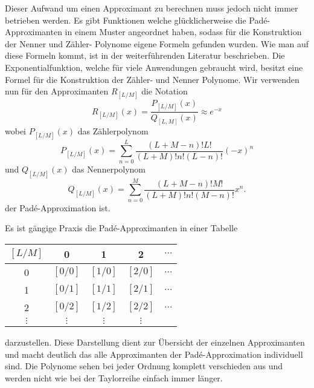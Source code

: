 Dieser Aufwand um einen Approximant zu berechnen muss jedoch nicht immer betrieben werden.
Es gibt Funktionen welche glücklicherweise die Padé-Approximanten in einem Muster angeordnet haben, sodass für die Konstruktion der Nenner und Zähler- Polynome eigene Formeln gefunden wurden.
Wie man auf diese Formeln kommt, ist in der weiterführenden Literatur \cite{pade:Baker2009} beschrieben.
Die Exponentialfunktion, welche für viele Anwendungen gebraucht wird, besitzt eine Formel \cite{pade:moler} für die Konstruktion der Zähler- und Nenner Polynome.
Wir verwenden nun für den Approximanten $R_{[L/M]}$ die Notation
\begin{equation}
R_{[L/M]}(x)
=
\frac{P_{[L/ M]}(x)}{Q_{[L, M]}(x)} \approx e^{-x}
\end{equation}
wobei $P_{[L/ M]}(x)$ das Zählerpolynom
\begin{equation}
P_{[L/ M]}(x)
=
\sum_{n=0}^{L} \frac{(L+M-n) ! L !}{(L+M) ! n !(L-n) !}(-x)^{n}
\label{pade:expP}
\end{equation}
und $Q_{[L/ M]}(x)$ das Nennerpolynom
\begin{equation}
Q_{[L/ M]}(x)
=
\sum_{n=0}^{M} \frac{(L+M-n) ! M !}{(L+M) ! n !(M-n) !} x^{n}.
\label{pade:expQ}
\end{equation}
 der Padé-Approximation ist.

Es ist gängige Praxis die Padé-Approximanten in einer Tabelle 
\begin{center}
	\begin{tabular}{c| c c c c}
		
		$[L/M]$ 	& 0 		& 1 		& 2 		& $\cdots$ \\
		\hline
		0 		& $[0/0]$ 	& $[1/0]$ 	& $[2/0]$ 	& $\dots$ \\
		1 		& $[0/1]$ 	& $[1/1]$ 	& $[2/1]$ 	& $\dots$ \\
		2 		& $[0/2]$ 	& $[1/2]$ 	& $[2/2]$ 	& $\dots$ \\
		$\vdots$ 	& $\vdots$ 	& $\vdots$  	& $\vdots$  	&  \\
	\end{tabular}
\end{center}
darzustellen.
Diese Darstellung dient zur Übersicht der einzelnen Approximanten und macht deutlich das alle Approximanten der Padé-Approximation individuell sind. 
Die Polynome sehen bei jeder Ordnung komplett verschieden aus und werden nicht wie bei der Taylorreihe einfach immer länger. 


